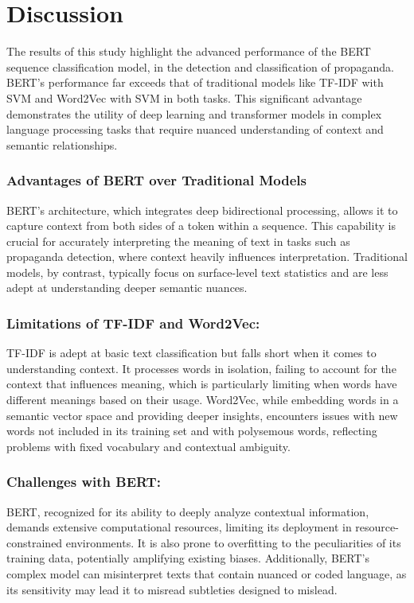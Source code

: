 \documentclass[twocolumn]{article}
\begin{document}
\section{Discussion}
The results of this study highlight the advanced performance of the BERT sequence classification model, in the detection and classification of propaganda. BERT's performance far exceeds that of traditional models like TF-IDF with SVM and Word2Vec with SVM in both tasks. This significant advantage demonstrates the utility of deep learning and transformer models in complex language processing tasks that require nuanced understanding of context and semantic relationships.

\subsubsection*{Advantages of BERT over Traditional Models}
BERT's architecture, which integrates deep bidirectional processing, allows it to capture context from both sides of a token within a sequence. This capability is crucial for accurately interpreting the meaning of text in tasks such as propaganda detection, where context heavily influences interpretation. Traditional models, by contrast, typically focus on surface-level text statistics and are less adept at understanding deeper semantic nuances.

\subsubsection*{Limitations of TF-IDF and Word2Vec:}
TF-IDF is adept at basic text classification but falls short when it comes to understanding context. It processes words in isolation, failing to account for the context that influences meaning, which is particularly limiting when words have different meanings based on their usage. Word2Vec, while embedding words in a semantic vector space and providing deeper insights, encounters issues with new words not included in its training set and with polysemous words, reflecting problems with fixed vocabulary and contextual ambiguity.

\subsubsection*{Challenges with BERT:}
BERT, recognized for its ability to deeply analyze contextual information, demands extensive computational resources, limiting its deployment in resource-constrained environments. It is also prone to overfitting to the peculiarities of its training data, potentially amplifying existing biases. Additionally, BERT’s complex model can misinterpret texts that contain nuanced or coded language, as its sensitivity may lead it to misread subtleties designed to mislead.
\end{document}
